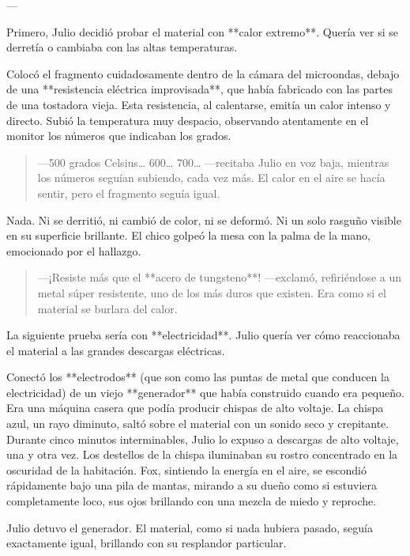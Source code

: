 \documentclass[a4paper,12pt]{book}
\begin{document}
---

Primero, Julio decidió probar el material con **calor extremo**. Quería ver si se derretía o cambiaba con las altas temperaturas.

Colocó el fragmento cuidadosamente dentro de la cámara del microondas, debajo de una **resistencia eléctrica improvisada**, que había fabricado con las partes de una tostadora vieja. Esta resistencia, al calentarse, emitía un calor intenso y directo. Subió la temperatura muy despacio, observando atentamente en el monitor los números que indicaban los grados.

\begin{quote}
    —500 grados Celsius… 600… 700… —recitaba Julio en voz baja, mientras los números seguían subiendo, cada vez más. El calor en el aire se hacía sentir, pero el fragmento seguía igual.
\end{quote}

Nada. Ni se derritió, ni cambió de color, ni se deformó. Ni un solo rasguño visible en su superficie brillante. El chico golpeó la mesa con la palma de la mano, emocionado por el hallazgo.

\begin{quote}
    —¡Resiste más que el **acero de tungsteno**! —exclamó, refiriéndose a un metal súper resistente, uno de los más duros que existen. Era como si el material se burlara del calor.
\end{quote}

La siguiente prueba sería con **electricidad**. Julio quería ver cómo reaccionaba el material a las grandes descargas eléctricas.

Conectó los **electrodos** (que son como las puntas de metal que conducen la electricidad) de un viejo **generador** que había construido cuando era pequeño. Era una máquina casera que podía producir chispas de alto voltaje. La chispa azul, un rayo diminuto, saltó sobre el material con un sonido seco y crepitante. Durante cinco minutos interminables, Julio lo expuso a descargas de alto voltaje, una y otra vez. Los destellos de la chispa iluminaban su rostro concentrado en la oscuridad de la habitación. Fox, sintiendo la energía en el aire, se escondió rápidamente bajo una pila de mantas, mirando a su dueño como si estuviera completamente loco, sus ojos brillando con una mezcla de miedo y reproche.

Julio detuvo el generador. El material, como si nada hubiera pasado, seguía exactamente igual, brillando con su resplandor particular.
\end{document}

